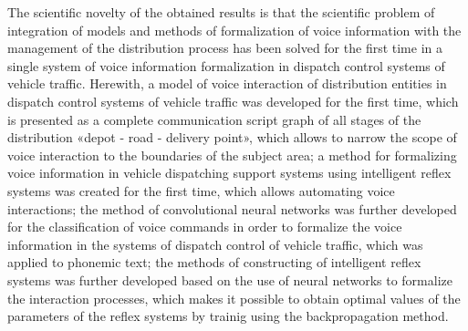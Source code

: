 
The scientific novelty of the obtained results is that the scientific problem of integration of models and methods of formalization of voice information with the management of the distribution process has been solved for the first time in a single system of voice information formalization in dispatch control systems of vehicle traffic. Herewith, a model of voice interaction of distribution entities in dispatch control systems of vehicle traffic was developed for the first time, which is presented as a complete communication script graph of all stages of the distribution «depot - road - delivery point», which allows to narrow the scope of voice interaction to the boundaries of the subject area; a method for formalizing voice information in vehicle dispatching support systems using intelligent reflex systems was created for the first time, which allows automating voice interactions; the method of convolutional neural networks was further developed for the classification of voice commands in order to formalize the voice information in the systems of dispatch control of vehicle traffic, which was applied to phonemic text; the methods of constructing of intelligent reflex systems was further developed based on the use of neural networks to formalize the interaction processes, which makes it possible to obtain optimal values of the parameters of the reflex systems by trainig using the backpropagation method.

